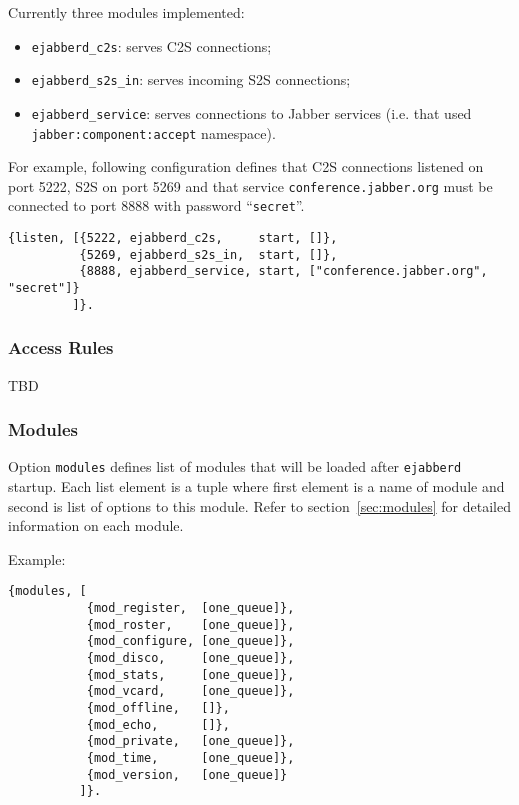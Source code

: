 \documentclass[12pt]{article}
\newcommand{\ejabberd}{\texttt{ejabberd}}
\newcommand{\Jabber}{Jabber}
\begin{document}
Currently three modules implemented:
\begin{itemize}
\item \texttt{ejabberd\_c2s}: serves C2S connections;
\item \texttt{ejabberd\_s2s\_in}: serves incoming S2S connections;
\item \texttt{ejabberd\_service}: serves connections to \Jabber{} services (i.e.
  that used \texttt{jabber:component:accept} namespace).
\end{itemize}

For example, following configuration defines that C2S connections listened on
port 5222, S2S on port 5269 and that service \texttt{conference.jabber.org}
must be connected to port 8888 with password ``\texttt{secret}''.

\begin{verbatim}
{listen, [{5222, ejabberd_c2s,     start, []},
          {5269, ejabberd_s2s_in,  start, []},
          {8888, ejabberd_service, start, ["conference.jabber.org", "secret"]}
         ]}.
\end{verbatim}


\subsubsection{Access Rules}
\label{sec:configaccess}

TBD


\subsubsection{Modules}
\label{sec:configmodules}

Option \texttt{modules} defines list of modules that will be loaded after
\ejabberd{} startup.  Each list element is a tuple where first element is a
name of module and second is list of options to this module.  Refer to
section~\ref{sec:modules} for detailed information on each module.

Example:
\begin{verbatim}
{modules, [
           {mod_register,  [one_queue]},
           {mod_roster,    [one_queue]},
           {mod_configure, [one_queue]},
           {mod_disco,     [one_queue]},
           {mod_stats,     [one_queue]},
           {mod_vcard,     [one_queue]},
           {mod_offline,   []},
           {mod_echo,      []},
           {mod_private,   [one_queue]},
           {mod_time,      [one_queue]},
           {mod_version,   [one_queue]}
          ]}.
\end{verbatim}
\end{document}
